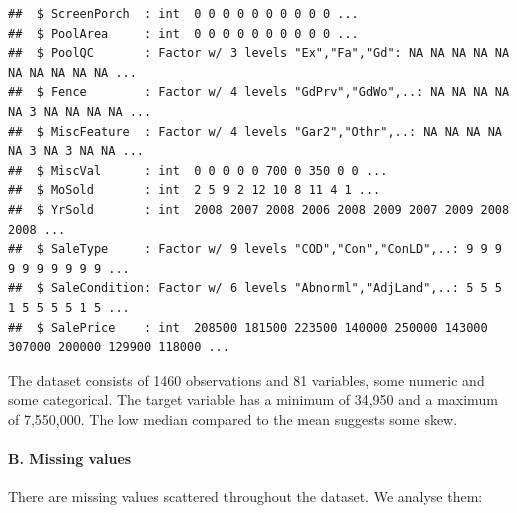 \documentclass[
]{article}
\begin{document}
\begin{verbatim}
##  $ ScreenPorch  : int  0 0 0 0 0 0 0 0 0 0 ...
##  $ PoolArea     : int  0 0 0 0 0 0 0 0 0 0 ...
##  $ PoolQC       : Factor w/ 3 levels "Ex","Fa","Gd": NA NA NA NA NA NA NA NA NA NA ...
##  $ Fence        : Factor w/ 4 levels "GdPrv","GdWo",..: NA NA NA NA NA 3 NA NA NA NA ...
##  $ MiscFeature  : Factor w/ 4 levels "Gar2","Othr",..: NA NA NA NA NA 3 NA 3 NA NA ...
##  $ MiscVal      : int  0 0 0 0 0 700 0 350 0 0 ...
##  $ MoSold       : int  2 5 9 2 12 10 8 11 4 1 ...
##  $ YrSold       : int  2008 2007 2008 2006 2008 2009 2007 2009 2008 2008 ...
##  $ SaleType     : Factor w/ 9 levels "COD","Con","ConLD",..: 9 9 9 9 9 9 9 9 9 9 ...
##  $ SaleCondition: Factor w/ 6 levels "Abnorml","AdjLand",..: 5 5 5 1 5 5 5 5 1 5 ...
##  $ SalePrice    : int  208500 181500 223500 140000 250000 143000 307000 200000 129900 118000 ...
\end{verbatim}

The dataset consists of 1460 observations and 81 variables, some numeric
and some categorical. The target variable has a minimum of 34,950 and a
maximum of 7,550,000. The low median compared to the mean suggests some
skew.

\hypertarget{b.-missing-values}{%
\paragraph{B. Missing values}\label{b.-missing-values}}

There are missing values scattered throughout the dataset. We analyse
them:
\end{document}

